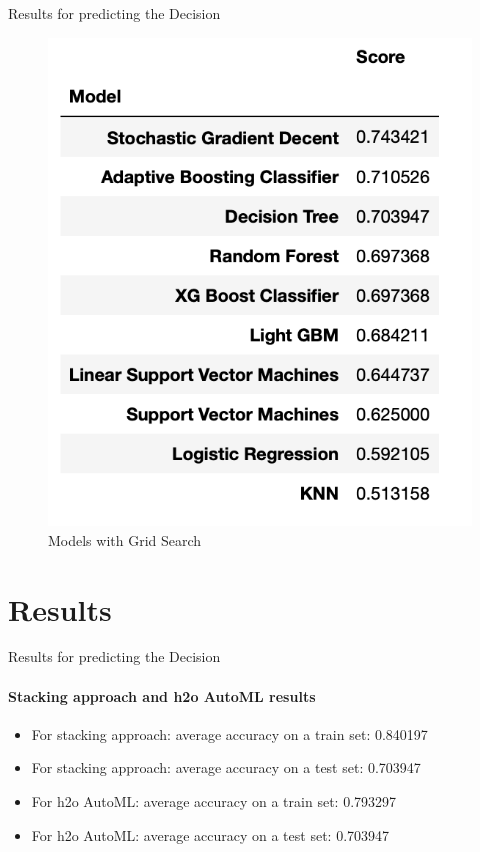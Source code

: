 \documentclass[11pt]{beamer}
\begin{document}
\begin{frame}{Results for predicting the Decision}
\begin{figure}
\begin{minipage}{0.49\textwidth}
		\includegraphics[width=1\textwidth]{Table2Decision} %
		\caption{Models with Grid Search}
	\end{minipage}
\end{figure}
\end{frame}

\section{Results}
\begin{frame}{Results for predicting the Decision}
\framesubtitle{ Stacking approach and h2o AutoML results}
\begin{itemize}
	\item For stacking approach:
	average accuracy on a train set: 0.840197
	\pause 
	\item For stacking approach:
average accuracy on a test set: 0.703947
\pause 
\item For h2o AutoML:
average accuracy on a train set: 0.793297
	\pause 
	\item For h2o AutoML:
	average accuracy on a test set: 0.703947
	\end{itemize}
\end{frame}
\end{document}
